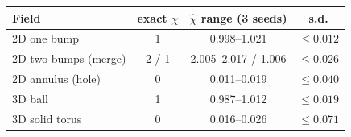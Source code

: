 \begin{tabular}{lccc}
\toprule
Field & exact $\chi$ & $\hat\chi$ range (3 seeds) & s.d. \\
\midrule
2D one bump & 1 & 0.998--1.021 & $\le 0.012$ \\
2D two bumps (merge) & 2 / 1 & 2.005--2.017 / 1.006 & $\le 0.026$ \\
2D annulus (hole) & 0 & 0.011--0.019 & $\le 0.040$ \\
3D ball & 1 & 0.987--1.012 & $\le 0.019$ \\
3D solid torus & 0 & 0.016--0.026 & $\le 0.071$ \\
\bottomrule
\end{tabular}